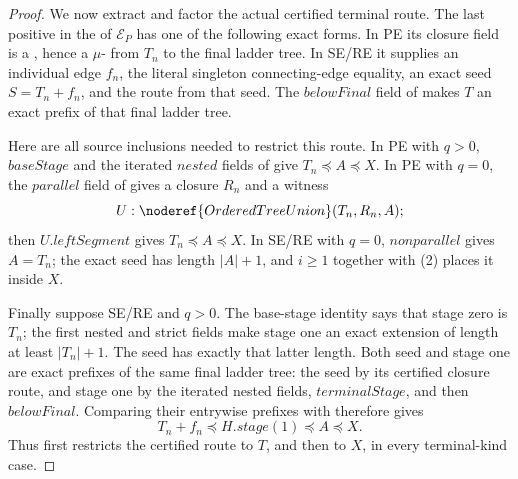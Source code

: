 \begin{proof}
We now extract and factor the actual certified terminal route.  The last
positive  in the
 of \(\mathcal E_P\) has one of the following
exact forms.  In PE its closure field is a
, hence a
\(\mu\)- from \(T_n\) to the final
ladder tree.  In SE/RE it supplies an individual edge \(f_n\), the literal
singleton connecting-edge equality, an exact
 seed \(S=T_n+f_n\), and the route from
that seed.  The \(\mathit{belowFinal}\) field of
 makes \(T\) an exact prefix of that final
ladder tree.

Here are all source inclusions needed to restrict this route.  In PE with
\(q>0\), \(\mathit{baseStage}\) and the iterated \(\mathit{nested}\)
fields of  give
\(T_n\preccurlyeq A\preccurlyeq X\).  In PE with \(q=0\), the
\(\mathit{parallel}\) field of  gives a closure
\(R_n\) and a witness
\[
              U:\noderef{OrderedTreeUnion}(T_n,R_n,A);
\]
then \(U.\mathit{leftSegment}\) gives
\(T_n\preccurlyeq A\preccurlyeq X\).  In SE/RE with \(q=0\),
\(\mathit{nonparallel}\) gives \(A=T_n\); the exact seed has length
\(|A|+1\), and \(i\ge1\) together with (2) places it inside \(X\).

Finally suppose SE/RE and \(q>0\).  The base-stage identity says that
stage zero is \(T_n\); the first nested and strict fields make stage one
an exact extension of length at least \(|T_n|+1\).  The seed has exactly
that latter length.  Both seed and stage one are exact prefixes of the
same final ladder tree: the seed by its certified closure route, and stage
one by the iterated nested fields, \(\mathit{terminalStage}\), and then
\(\mathit{belowFinal}\).  Comparing their entrywise prefixes with
 therefore gives
\[
 T_n+f_n\preccurlyeq H.\mathit{stage}(1)
             \preccurlyeq A\preccurlyeq X.                   \tag{15}
\]
Thus  first restricts the
certified route to \(T\), and then to \(X\), in every terminal-kind case.


\end{proof}
